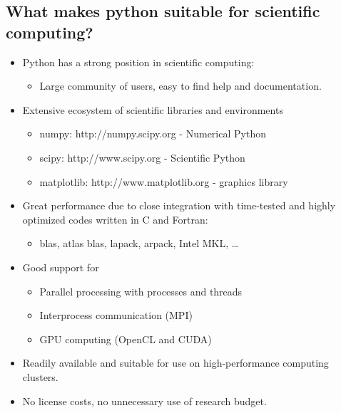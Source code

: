 \documentclass[11pt]{article}
\providecommand{\tightlist}{%
      \setlength{\itemsep}{0pt}\setlength{\parskip}{0pt}}
\begin{document}
    \hypertarget{what-makes-python-suitable-for-scientific-computing}{%
\subsection{What makes python suitable for scientific
computing?}\label{what-makes-python-suitable-for-scientific-computing}}

    \begin{itemize}
\item
  Python has a strong position in scientific computing:

  \begin{itemize}
  \tightlist
  \item
    Large community of users, easy to find help and documentation.
  \end{itemize}
\item
  Extensive ecosystem of scientific libraries and environments

  \begin{itemize}
  \tightlist
  \item
    numpy: http://numpy.scipy.org - Numerical Python
  \item
    scipy: http://www.scipy.org - Scientific Python
  \item
    matplotlib: http://www.matplotlib.org - graphics library
  \end{itemize}
\item
  Great performance due to close integration with time-tested and highly
  optimized codes written in C and Fortran:

  \begin{itemize}
  \tightlist
  \item
    blas, atlas blas, lapack, arpack, Intel MKL, \ldots{}
  \end{itemize}
\item
  Good support for

  \begin{itemize}
  \tightlist
  \item
    Parallel processing with processes and threads
  \item
    Interprocess communication (MPI)
  \item
    GPU computing (OpenCL and CUDA)
  \end{itemize}
\item
  Readily available and suitable for use on high-performance computing
  clusters.
\item
  No license costs, no unnecessary use of research budget.
\end{itemize}
\end{document}

